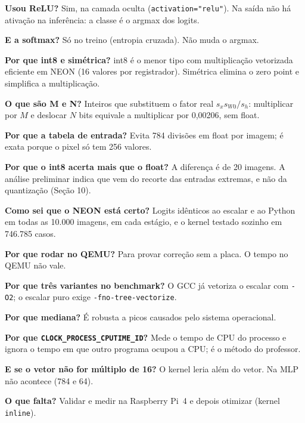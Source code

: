 \documentclass[10pt]{article}
\begin{document}
\textbf{Usou ReLU?} Sim, na camada oculta (\texttt{activation="relu"}). Na saída não há ativação na
inferência: a classe é o argmax dos logits.

\textbf{E a softmax?} Só no treino (entropia cruzada). Não muda o argmax.

\textbf{Por que int8 e simétrica?} int8 é o menor tipo com multiplicação vetorizada eficiente em NEON
(16 valores por registrador). Simétrica elimina o zero point e simplifica a multiplicação.

\textbf{O que são M e N?} Inteiros que substituem o fator real $s_x s_{W0}/s_h$: multiplicar por $M$ e
deslocar $N$ bits equivale a multiplicar por 0,00206, sem float.

\textbf{Por que a tabela de entrada?} Evita 784 divisões em float por imagem; é exata porque o
pixel só tem 256 valores.

\textbf{Por que o int8 acerta mais que o float?} A diferença é de 20 imagens. A análise preliminar
indica que vem do recorte das entradas extremas, e não da quantização (Seção 10).

\textbf{Como sei que o NEON está certo?} Logits idênticos ao escalar e ao Python em todas as 10.000
imagens, em cada estágio, e o kernel testado sozinho em 746.785 casos.

\textbf{Por que rodar no QEMU?} Para provar correção sem a placa. O tempo no QEMU não vale.

\textbf{Por que três variantes no benchmark?} O GCC já vetoriza o escalar com \texttt{-O2}; o escalar
puro exige \texttt{-fno-tree-vectorize}.

\textbf{Por que mediana?} É robusta a picos causados pelo sistema operacional.

\textbf{Por que \texttt{CLOCK\_PROCESS\_CPUTIME\_ID}?} Mede o tempo de CPU do processo e ignora
o tempo em que outro programa ocupou a CPU; é o método do professor.

\textbf{E se o vetor não for múltiplo de 16?} O kernel leria além do vetor. Na MLP não acontece
(784 e 64).

\textbf{O que falta?} Validar e medir na Raspberry Pi~4 e depois otimizar (kernel \texttt{inline}).
\end{document}
